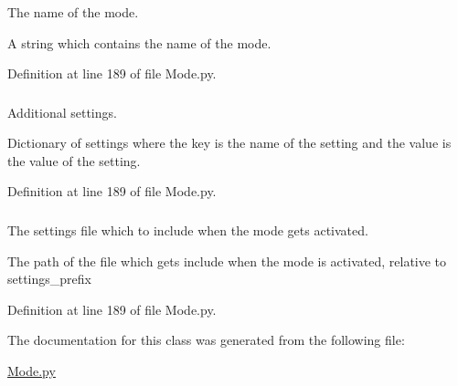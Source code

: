 \hypertarget{class_mode_1_1_mode_a22d3bd9cd7813368ddc9776639e1858b}{
\subsubsection[{name}]{}}
\label{class_mode_1_1_mode_a22d3bd9cd7813368ddc9776639e1858b}


\-The name of the mode. 

\-A string which contains the name of the mode. 

\-Definition at line 189 of file \-Mode.\-py.

\hypertarget{class_mode_1_1_mode_a25aef866f99b51dd7f350bac9d3b4e2e}{
\subsubsection[{settings}]{}}
\label{class_mode_1_1_mode_a25aef866f99b51dd7f350bac9d3b4e2e}


\-Additional settings. 

\-Dictionary of settings where the key is the name of the setting and the value is the value of the setting. 

\-Definition at line 189 of file \-Mode.\-py.

\hypertarget{class_mode_1_1_mode_a83b66f5529079e8d1b9c6512935de32a}{
\subsubsection[{settings\-\_\-file}]{}}
\label{class_mode_1_1_mode_a83b66f5529079e8d1b9c6512935de32a}


\-The settings file which to include when the mode gets activated. 

\-The path of the file which gets include when the mode is activated, relative to settings\-\_\-prefix 

\-Definition at line 189 of file \-Mode.\-py.



\-The documentation for this class was generated from the following file\-:\begin{DoxyCompactItemize}
\item 
\hyperlink{_mode_8py}{\-Mode.\-py}\end{DoxyCompactItemize}
